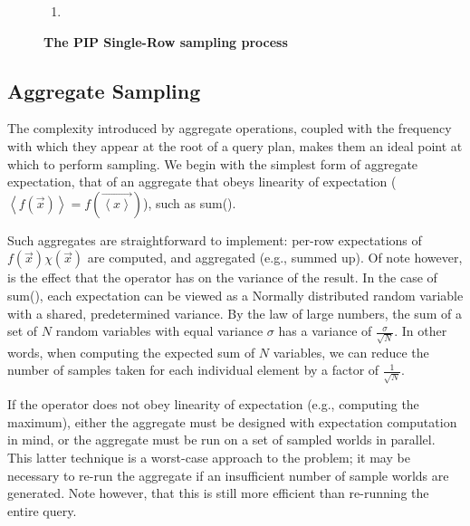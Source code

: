 \begin{figure}
\begin{center}
\begin{enumerate}
\item 
\end{enumerate}
\caption{\textbf{The PIP Single-Row sampling process}}
\vspace*{-0.2in}
\label{fig:roadmap}
\end{center}
\vspace*{-0.15in}
\end{figure}

\subsection{Aggregate Sampling}
The complexity introduced by aggregate operations, coupled with the frequency with which they appear at the root of a query plan, makes them an ideal point at which to perform sampling.  We begin with the simplest form of aggregate expectation, that of an aggregate that obeys linearity of expectation ($\left<f(\vec{x})\right> = f(\vec{\left<x\right>})$), such as sum().  

Such aggregates are straightforward to implement: per-row expectations of $f(\vec x)\chi(\vec x)$ are computed, and aggregated (e.g., summed up).  Of note however, is the effect that the operator has on the variance of the result.  In the case of sum(), each expectation can be viewed as a Normally distributed random variable with a shared, predetermined variance.  By the law of large numbers, the sum of a set of $N$ random variables with equal variance $\sigma$ has a variance of $\frac{\sigma}{\sqrt{N}}$.  In other words, when computing the expected sum of $N$ variables, we can reduce the number of samples taken for each individual element by a factor of $\frac{1}{\sqrt{N}}$.

If the operator does not obey linearity of expectation (e.g., computing the maximum), either the aggregate must be designed with expectation computation in mind, or the aggregate must be run on a set of sampled worlds in parallel.  This latter technique is a worst-case approach to the problem; it may be necessary to re-run the aggregate if an insufficient number of sample worlds are generated. Note however, that this is still more efficient than re-running the entire query.

